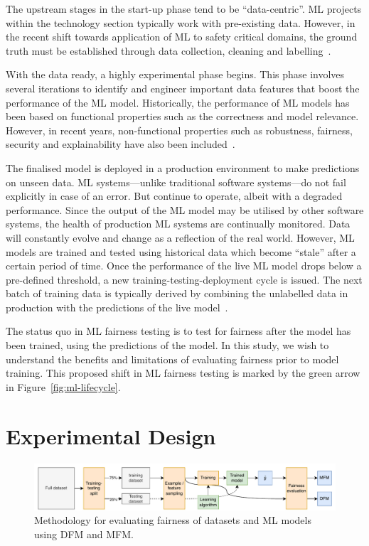 \documentclass[conference]{IEEEtran}
\begin{document}
The upstream stages in the start-up phase tend to be ``data-centric''.
ML projects within the technology section typically work with
pre-existing data. However, in the recent shift towards application of
ML to safety critical domains, the ground truth must be established
through data collection, cleaning and
labelling \cite{sambasivan2021everyone,bosch2021engineering,amershi2019software}.

With the data ready, a highly experimental phase begins. This phase
involves several iterations to identify and engineer important data
features that boost the performance of the ML model. Historically, the
performance of ML models has been based on functional properties such
as the correctness and model relevance. However, in recent years,
non-functional properties such as robustness, fairness, security and
explainability have also been included \cite{zhang2020machine}.

The finalised model is deployed in a production environment to make
predictions on unseen data. ML systems---unlike traditional software
systems---do not fail explicitly in case of an error. But continue to
operate, albeit with a degraded performance. Since the output of the
ML model may be utilised by other software systems, the health of
production ML systems are continually monitored. Data will constantly
evolve and change as a reflection of the real world. However, ML
models are trained and tested using historical data which become
``stale'' after a certain period of time. Once the performance of the
live ML model drops below a pre-defined threshold, a new
training-testing-deployment cycle is issued. The next batch of
training data is typically derived by combining the unlabelled data in
production with the predictions of the live
model \cite{breck2019data,hynes2017data,breck2017ml}.

The status quo in ML fairness testing is to test for fairness after
the model has been trained, using the predictions of the model. In
this study, we wish to understand the benefits and limitations of
evaluating fairness prior to model training. This proposed shift in ML
fairness testing is marked by the green arrow in
Figure \ref{fig:ml-lifecycle}.

\section{Experimental Design}\label{sec:method}

\begin{figure}
  \centering
  \includegraphics[width=\linewidth]{method.pdf}
  \caption{Methodology for evaluating fairness of datasets and ML
  models using DFM and MFM.}
  \label{fig:method}
\end{figure}
\end{document}
